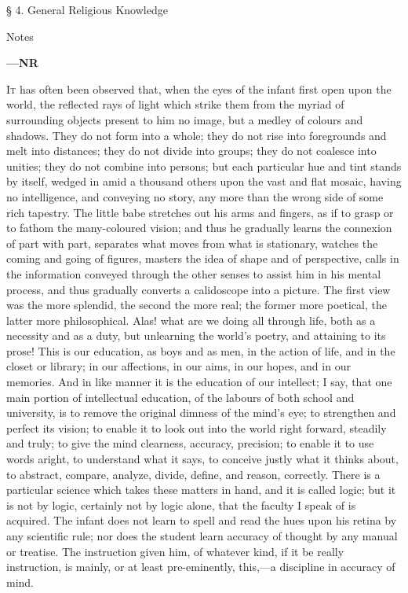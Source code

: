 § 4. General Religious Knowledge

Notes

\textbf{—NR}

I\textsc{t} has often been observed that, when the eyes of the infant
first open upon the world, the reflected rays of light which strike
them from the myriad of surrounding objects present to him no image,
but a medley of colours and shadows. They do not form into a whole;
they do not rise into foregrounds and melt into distances; they do not
divide into groups; they do not coalesce into unities; they do not
combine into persons; but each particular hue and tint stands by
itself, wedged in amid a thousand others upon the vast and flat
mosaic, having no intelligence, and conveying no story, any more than
the wrong side of some rich tapestry. The little babe stretches out
his arms and fingers, as if to grasp or to fathom the many-coloured
vision; and thus he gradually learns the connexion of part with part,
separates what moves from what is stationary, watches the coming and
going of figures, masters the idea of shape and of perspective, calls
in the information conveyed through the other senses to assist him in
his mental process, and thus gradually converts a calidoscope into a
picture. The first view was the more splendid, the second the more
real; the former more poetical, the latter more philosophical. Alas!
what are we doing all through life, both as a necessity and as a duty,
but unlearning the world's poetry, and attaining to its prose!
This is our education, as boys and as men, in the action of life, and
in the closet or library; in our affections, in our aims, in our
hopes, and in our memories. And in like manner it is the education of
our intellect; I say, that one main portion of intellectual education,
of the labours of both school and university, is to remove the
original dimness of the mind's eye; to strengthen and perfect its
vision; to enable it to look out into the world right forward,
steadily and truly; to give the mind clearness, accuracy, precision;
to enable it to use words aright, to understand what it says, to
conceive justly what it thinks about, to abstract, compare, analyze,
divide, define, and reason, correctly. There is a particular science
which takes these matters in hand, and it is called logic; but it is
not by logic, certainly not by logic alone, that the faculty I speak
of is acquired. The infant does not learn to spell and read the hues
upon his retina by any scientific rule; nor does the student learn
accuracy of thought by any manual or treatise. The instruction given
him, of whatever kind, if it be really instruction, is mainly, or at
least pre-eminently, this,—a discipline in accuracy of mind.

